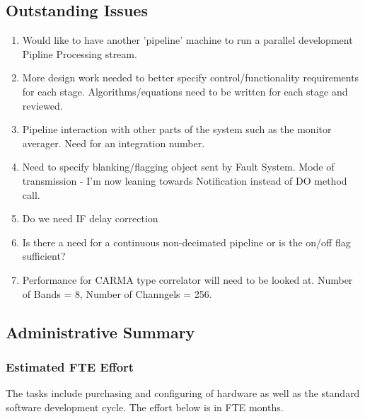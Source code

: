 \documentclass[11pt]{article}
\begin{document}
\subsection{Outstanding Issues}
%
%
\begin{enumerate}

\item
Would like to have another 'pipeline' machine to run a parallel development
Pipline Processing stream.

\item
More design work needed to better specify control/functionality requirements
for each stage. Algorithms/equations need to be written for each stage
and reviewed.

\item
Pipeline interaction with other parts of the system such as the monitor
averager. Need for an integration number.

\item
Need to specify blanking/flagging object sent by Fault System.
Mode of transmission - I'm now leaning towards Notification instead of
DO method call.

\item
Do we need IF delay correction

\item
Is there a need for a continuous non-decimated pipeline or is the on/off
flag sufficient?

\item
Performance for CARMA type correlator will need to be looked at. Number
of Bands = 8, Number of Channgels = 256.


\end{enumerate}
%
%
\subsection{Administrative Summary}
%
%
\subsubsection{Estimated FTE Effort}
%
%
The tasks include purchasing and configuring of hardware as well as the
standard software development cycle.  The effort below is in FTE months.
\end{document}
